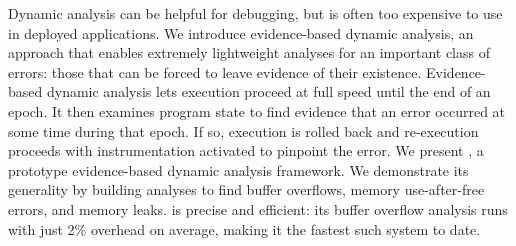 Dynamic analysis can be helpful for debugging, but is often too
expensive to use in deployed applications. We introduce evidence-based
dynamic analysis, an approach that enables extremely lightweight
analyses for an important class of errors: those that can be forced to
leave evidence of their existence. Evidence-based dynamic analysis lets
execution proceed at full speed until the end of an epoch. It then
examines program state to find evidence that an error occurred at some
time during that epoch. If so, execution is rolled back and
re-execution proceeds with instrumentation activated to pinpoint the
error. We present \doubletake{}, a prototype evidence-based dynamic
analysis framework. We demonstrate its generality by building analyses
to find buffer overflows, memory use-after-free errors, and memory
leaks. \doubletake{} is precise and efficient: its buffer overflow
analysis runs with just 2\% overhead on average, making it the fastest
such system to date.


